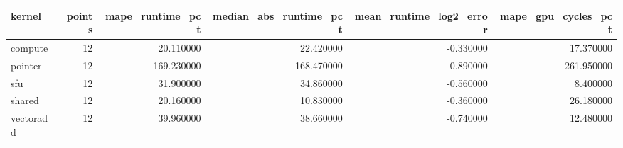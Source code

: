 \begin{tabular}{lrrrrr}
\toprule
kernel & points & mape_runtime_pct & median_abs_runtime_pct & mean_runtime_log2_error & mape_gpu_cycles_pct \\
\midrule
compute & 12 & 20.110000 & 22.420000 & -0.330000 & 17.370000 \\
pointer & 12 & 169.230000 & 168.470000 & 0.890000 & 261.950000 \\
sfu & 12 & 31.900000 & 34.860000 & -0.560000 & 8.400000 \\
shared & 12 & 20.160000 & 10.830000 & -0.360000 & 26.180000 \\
vectoradd & 12 & 39.960000 & 38.660000 & -0.740000 & 12.480000 \\
\bottomrule
\end{tabular}
